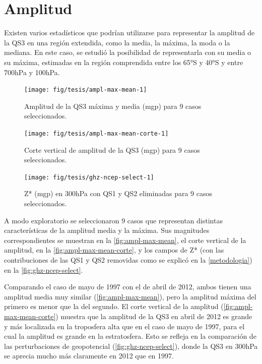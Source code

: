 \documentclass[spanish,a4paper,12pt,oneside]{book}
\begin{document}
\section{Amplitud}\label{amplitud}

Existen varios estadísticos que podrían utilizarse para representar la
amplitud de la QS3 en una región extendida, como la media, la máxima, la
moda o la mediana. En este caso, se estudió la posibilidad de
representarla con su media o su máxima, estimadas en la región
comprendida entre los 65°S y 40°S y entre 700hPa y 100hPa.

\begin{figure}
\texttt{[image: fig/tesis/ampl-max-mean-1]} \caption{Amplitud de la QS3 máxima y media (mgp) para 9 casos seleccionados.}\label{fig:ampl-max-mean}
\end{figure}

\begin{figure}
\texttt{[image: fig/tesis/ampl-max-mean-corte-1]} \caption{Corte vertical de amplitud de la QS3 (mgp) para 9 casos seleccionados.}\label{fig:ampl-max-mean-corte}
\end{figure}

\begin{figure}
\texttt{[image: fig/tesis/ghz-ncep-select-1]} \caption{Z* (mgp) en 300hPa con QS1 y QS2 eliminadas para 9 casos seleccionados.}\label{fig:ghz-ncep-select}
\end{figure}

A modo exploratorio se seleccionaron 9 casos que representan distintas
características de la amplitud media y la máxima. Sus magnitudes
correspondientes se muestran en la \autoref{fig:ampl-max-mean}, el corte
vertical de la amplitud, en la \autoref{fig:ampl-max-mean-corte}, y los
campos de Z* (con las contribuciones de las QS1 y QS2 removidas como se
explicó en la \autoref{metodologia}) en la
\autoref{fig:ghz-ncep-select}.

Comparando el caso de mayo de 1997 con el de abril de 2012, ambos tienen
una amplitud media muy similar (\autoref{fig:ampl-max-mean}), pero la
amplitud máxima del primero es menor que la del segundo. El corte
vertical de la amplitud (\autoref{fig:ampl-max-mean-corte}) muestra que
la amplitud de la QS3 en abril de 2012 es grande y más localizada en la
troposfera alta que en el caso de mayo de 1997, para el cual la amplitud
es grande en la estratosfera. Esto se refleja en la comparación de las
perturbaciones de geopotencial (\autoref{fig:ghz-ncep-select}), donde la
QS3 en 300hPa se aprecia mucho más claramente en 2012 que en 1997.
\end{document}
